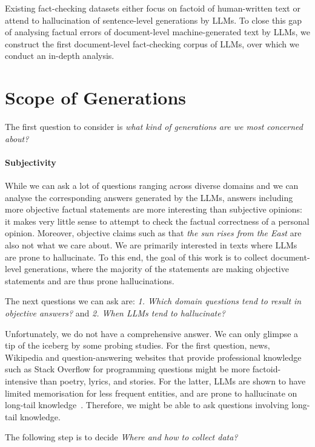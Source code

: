 \documentclass[11pt]{article}
\begin{document}
Existing fact-checking datasets either focus on factoid of human-written text or attend to hallucination of sentence-level generations by LLMs.
To close this gap of analysing factual errors of document-level machine-generated text by LLMs, we construct the first document-level fact-checking corpus of LLMs, over which we conduct an in-depth analysis.


\section{Scope of Generations}
The first question to consider is \emph{what kind of generations are we most concerned about?}

\paragraph{Subjectivity} While we can ask a lot of questions ranging across diverse domains and we can analyse the corresponding answers generated by the LLMs, answers including more objective factual statements are more interesting than subjective opinions: it makes very little sense to attempt to check the factual correctness of a personal opinion.
Moreover, objective claims such as that \emph{the sun rises from the East} are also not what we care about.
We are primarily interested in texts where LLMs are prone to hallucinate.   
To this end, the goal of this work is to collect document-level generations, where the majority of the statements are making objective statements and are thus prone hallucinations. 

The next questions we can ask are: \textit{1. Which domain questions tend to result in objective answers?} and \textit{2. When LLMs tend to hallucinate?}

Unfortunately, we do not have a comprehensive answer. 
We can only glimpse a tip of the iceberg by some probing studies.
For the first question, news, Wikipedia and question-answering websites that provide professional knowledge such as Stack Overflow for programming questions might be more factoid-intensive than poetry, lyrics, and stories. 
For the latter, LLMs are shown to have limited memorisation for less frequent entities, and are prone to hallucinate on long-tail knowledge~\citep{nikhil2022longtail, alex2022when}.
Therefore, we might be able to ask questions involving long-tail knowledge.

The following step is to decide \textit{Where and how to collect data?}
\end{document}
